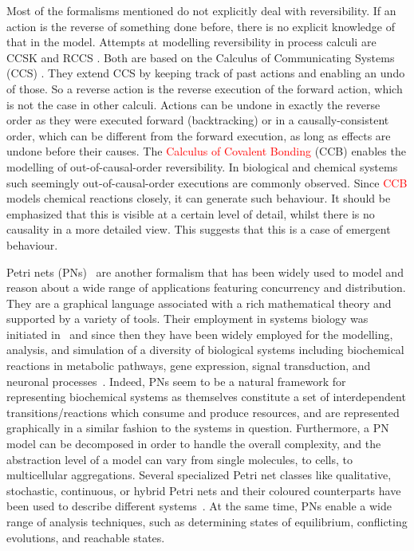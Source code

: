 \documentclass[runningheads]{llncs}
\newcommand\anna[1]{\textcolor{red}{#1}}
\begin{document}
Most of the formalisms mentioned do not explicitly deal with reversibility. If an action is the reverse of something done before, there is no explicit knowledge of that in the model. Attempts at modelling reversibility in process calculi are CCSK \cite{Irek2007} and RCCS \cite{danos2004ccsr}. Both are based on the Calculus of Communicating Systems (CCS) \cite{MilnerBook}. They extend CCS by keeping track of past actions and enabling an undo of those. So a reverse action is the reverse execution of the forward action, which is not the case in other calculi. Actions can be undone in exactly the reverse order as they were executed forward (backtracking) or in a causally-consistent order, which can be different from the forward execution, as long as effects are undone before their causes. The \anna{Calculus of Covalent Bonding} (CCB) \cite{KUHN201818} enables the modelling of out-of-causal-order reversibility. In biological and chemical systems such seemingly out-of-causal-order executions are commonly observed. Since \anna{CCB} models chemical reactions closely, it can generate such behaviour. It should be emphasized that this is visible at a certain level of detail, whilst there is no causality in a more detailed view. This suggests that this is a case of emergent behaviour.

Petri nets (PNs)~\cite{PNs} are another formalism that has been widely used to model and reason
about a wide range of applications featuring concurrency and distribution. They are a graphical 
language  associated with 
a rich mathematical theory and supported by a variety of tools. Their employment in systems 
biology was initiated in~\cite{DBLP:conf/ismb/ReddyML93,DBLP:journals/jsamas/HofestadtH94}
and since then they have been widely employed for
the modelling, analysis, and simulation of a diversity of biological systems including 
biochemical reactions in metabolic pathways, gene expression, signal transduction, and neuronal processes~\cite{PNbiology,DBLP:journals/bib/Chaouiya07,DBLP:journals/nc/BaldanCMS10}. Indeed, PNs seem to be a natural framework for representing biochemical systems as themselves constitute a set of interdependent
transitions/reactions which consume 
and produce resources, and are represented graphically in a similar fashion to the systems
in question. Furthermore, a PN model
can be decomposed in order to handle the overall complexity, and the abstraction level of a model
can vary from single molecules, to cells, to multicellular aggregations.
Several specialized Petri net classes like qualitative, stochastic, continuous, or
hybrid Petri nets and their coloured counterparts have been used to describe different
systems~\cite{DBLP:journals/jamia/PelegRA05,DBLP:journals/isb/HofestadtT98,DBLP:journals/fuin/Popova-ZeugmannHK05,DBLP:journals/nc/MatsunoNM11,DBLP:journals/isb/VossHK03}.
At the same time, PNs enable a wide range of analysis techniques, 
such as determining states of equilibrium, conflicting evolutions, 
and reachable states. 
\end{document}
